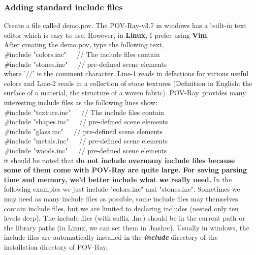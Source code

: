 \documentclass[fleqn,10pt]{wlscirep}
\newcommand*{\PV}{POV-Ray}
\newcommand*{\DF}{Definition in English}
\begin{document}
\subsubsection{Adding standard include files}
Create a file called demo.pov. The \PV-v3.7 in windows has a built-in text editor which is easy to use. However, in \textbf{Linux}, I prefer using \textbf{Vim}.\\
\newline
After creating the demo.pov, type the following text,\\
\textcolor[rgb]{0.2,0.1,1}{\emph{\#}include "colors.inc"}\ \ \     // The include files contain \\
\textcolor[rgb]{0.2,0.1,1}{\emph{\#}include "stones.inc"}\ \ \     // pre-defined scene elements\\
where '//' is the comment character. Line-1 reads in defections for various useful colors and Line-2 reads in a collection of stone textures (\DF: the surface of a material, the structure of a woven fabric). \PV~provides many interesting include files as the following lines show:\\
\textcolor[rgb]{0.2,0.1,1}{\emph{\#}include "texture.inc"}\ \ \     // The include files contain\\
\textcolor[rgb]{0.2,0.1,1}{\emph{\#}include "shapes.inc"}\ \ \     // pre-defined scene elements\\
\textcolor[rgb]{0.2,0.1,1}{\emph{\#}include "glass.inc"}\ \ \     // pre-defined scene elements\\
\textcolor[rgb]{0.2,0.1,1}{\emph{\#}include "metals.inc"}\ \ \     // pre-defined scene elements\\
\textcolor[rgb]{0.2,0.1,1}{\emph{\#}include "woods.inc"}\ \ \     // pre-defined scene elements\\
it should be noted that \textbf{do not include overmany include files because some of them come with \PV{} are quite large. For saving parsing time and memory, we'd better include what we really need.} In the following examples we just include "colors.inc" and "stones.inc". Sometimes we may need as many include files as possible, some include files may themselves contain include files, but we are limited to declaring includes (nested only ten levels deep). The include files (with suffix .Inc) should be in the current path or the library paths (in Linux, we can set them in .bashrc). Usually in windows, the include files are automatically installed in the \emph{\textbf{include}} directory of the installation directory of \PV.
\end{document}
